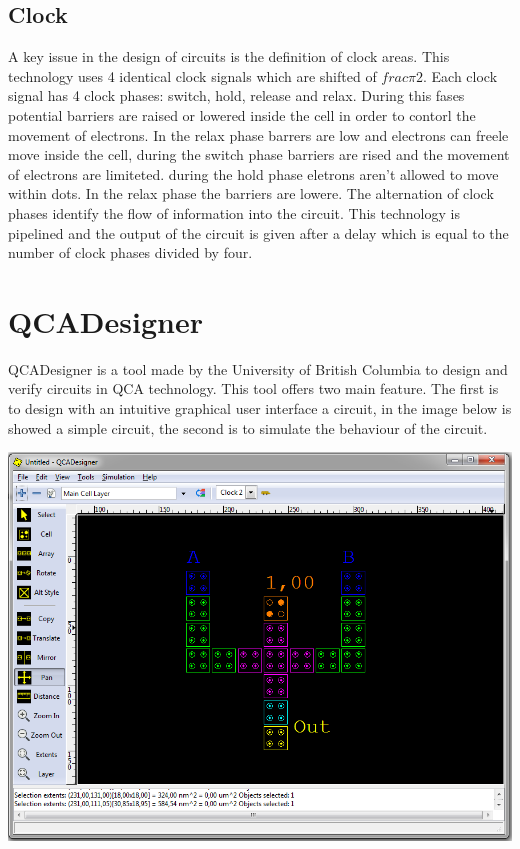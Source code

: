 \subsection{Clock}
\label{delay}
A key issue in the design of circuits is the definition of clock areas. This technology uses 4 identical clock signals which are shifted of $frac{\pi}{2}$. Each clock signal has 4 clock phases: switch, hold, release and relax. During this fases potential barriers are raised or lowered inside the cell in order to contorl the movement of electrons. In the relax phase barrers are low and electrons can freele move inside the cell, during the switch phase barriers are rised and the movement of electrons are limiteted. during the hold phase eletrons aren't allowed to move within dots. In the relax phase the barriers are lowere. The alternation of clock phases identify the flow of information into the circuit. \newline
This technology is pipelined and the output of the circuit is given after a delay which is equal to the number of clock phases divided by four.

\section{QCADesigner}
QCADesigner is a tool made by the University of British Columbia to design and verify circuits in QCA technology. This tool offers two main feature. The first is to design with an intuitive graphical user interface a circuit, in the image below is showed a simple circuit, the second is to simulate the behaviour of the circuit. 

\includegraphics[scale=0.4]{img/QCADesigner.png}

